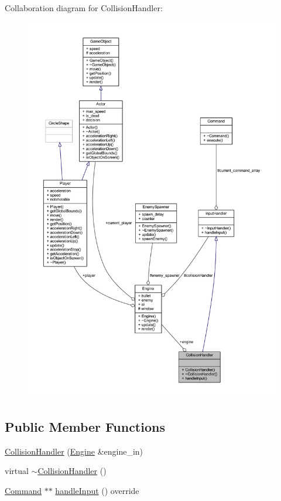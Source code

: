 Collaboration diagram for Collision\+Handler\+:
\nopagebreak
\begin{figure}[H]
\begin{center}
\leavevmode
\includegraphics[width=350pt]{class_collision_handler__coll__graph}
\end{center}
\end{figure}
\subsection*{Public Member Functions}
\begin{DoxyCompactItemize}
\item 
\hyperlink{class_collision_handler_a1d575178fc7de4a35e9f0abb1f7f6395}{Collision\+Handler} (\hyperlink{class_engine}{Engine} \&engine\+\_\+in)
\item 
virtual \hyperlink{class_collision_handler_a99f5524cf1706f9ea95500cf273a9d97}{$\sim$\+Collision\+Handler} ()
\item 
\hyperlink{class_command}{Command} $\ast$$\ast$ \hyperlink{class_collision_handler_a7f6deb84dcebcc72e0020eb251ea617f}{handle\+Input} () override
\end{DoxyCompactItemize}
